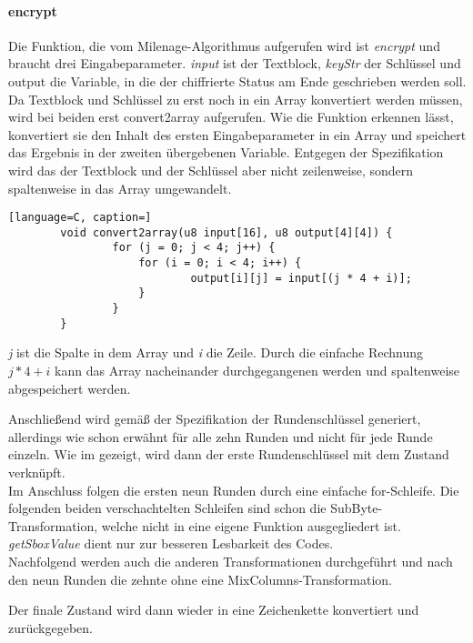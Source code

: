 		\paragraph{encrypt}
		Die Funktion, die vom Milenage-Algorithmus aufgerufen wird ist \emph{encrypt} und
		braucht drei Eingabeparameter. \emph{input} ist der Textblock, \emph{keyStr} der
		Schlüssel und output die Variable, in die der chiffrierte Status am Ende geschrieben
		werden soll. \\
		Da Textblock und Schlüssel zu erst noch in ein Array konvertiert werden müssen,
		wird bei beiden erst convert2array aufgerufen. Wie die Funktion erkennen lässt,
		konvertiert sie den Inhalt des ersten Eingabeparameter in ein Array und speichert das
		Ergebnis in der zweiten übergebenen Variable. Entgegen der Spezifikation wird das
		der Textblock und der Schlüssel aber nicht zeilenweise, sondern spaltenweise in das
		Array umgewandelt.

		\begin{lstlisting}[language=C, caption=]
		void convert2array(u8 input[16], u8 output[4][4]) {
    			for (j = 0; j < 4; j++) {
        			for (i = 0; i < 4; i++) {
            				output[i][j] = input[(j * 4 + i)];
        			}
    			}
		} 
        	\end{lstlisting}

		\emph{j} ist die Spalte in dem Array und \emph{i} die Zeile. Durch die einfache
		Rechnung $j*4+i$ kann das Array nacheinander durchgegangenen werden und spaltenweise
		abgespeichert werden.

		Anschließend wird gemäß der Spezifikation der Rundenschlüssel generiert, allerdings
		wie schon erwähnt für alle zehn Runden und nicht für jede Runde einzeln. Wie im
		 gezeigt, wird dann der erste Rundenschlüssel mit dem
		Zustand verknüpft. \\
		Im Anschluss folgen die ersten neun Runden durch eine einfache for-Schleife. Die
		folgenden beiden verschachtelten Schleifen sind schon die SubByte-Transformation,
		welche nicht in eine eigene Funktion ausgegliedert ist. \emph{getSboxValue} dient
		nur zur besseren Lesbarkeit des Codes. \\
		Nachfolgend werden auch die anderen Transformationen durchgeführt und nach den neun
		Runden die zehnte ohne eine MixColumns-Transformation.

		Der finale Zustand wird dann wieder in eine Zeichenkette konvertiert und
		zurückgegeben.

